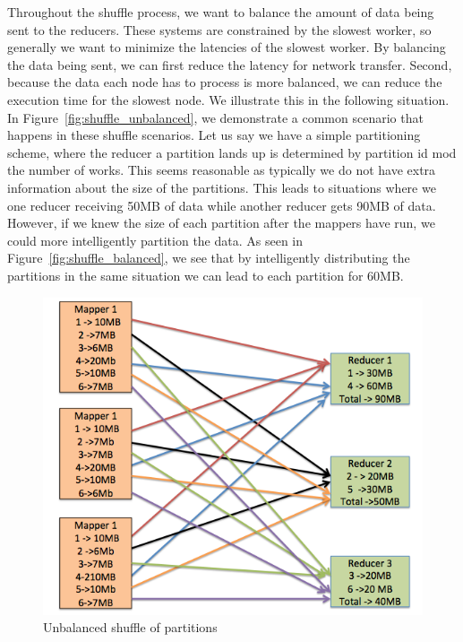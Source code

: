 Throughout the shuffle process, we want to balance the amount of data being sent to the reducers. 
These systems are constrained by the slowest worker, so generally we want to minimize the latencies of the slowest worker.
By balancing the data being sent, we can first reduce the latency for network transfer. Second, because the data each node 
has to process is more balanced, we can reduce the execution time for the slowest node. We illustrate this in the following situation.
In Figure~\ref{fig:shuffle_unbalanced}, we demonstrate a common scenario that happens in these shuffle scenarios. Let us say we have a simple
partitioning scheme, where the reducer a partition lands up is determined by partition id mod the number of works. This seems reasonable
as typically we do not have extra information about the size of the partitions. This leads to situations where we one reducer receiving
50MB of data while another reducer gets 90MB of data. However, if we knew the size of each partition after the mappers have run,
we could more intelligently partition the data. As seen in Figure~\ref{fig:shuffle_balanced}, we see that by intelligently distributing the partitions in the same situation we can lead to each partition for 60MB. 


 \begin{figure}[h]
\begin{center}
\includegraphics[scale=1.0]{./img/shuffle_unbalanced.png}
\caption{Unbalanced shuffle of partitions} 
\label{fig:shuffle_unbalanced.png}
\end{center}
\end{figure}

